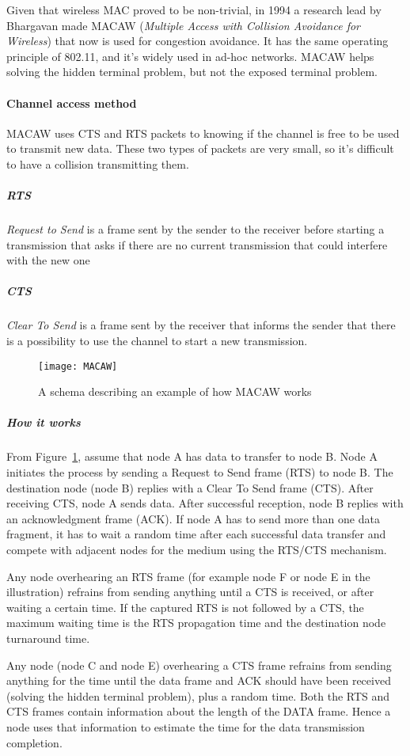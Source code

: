 Given that wireless MAC proved to be non-trivial, in 1994 a research lead by
Bhargavan made MACAW (\textit{Multiple Access with Collision Avoidance for
  Wireless}) that now is used for congestion avoidance. It has the same
operating principle of 802.11, and it's widely used in ad-hoc networks.
MACAW helps solving the hidden terminal problem, but not the exposed terminal
problem.

\paragraph*{Channel access method}
MACAW uses CTS and RTS packets to knowing if the channel is free to be used to
transmit new data. These two types of packets are very small, so it's difficult
to have a collision transmitting them.

\subparagraph*{RTS} \textit{Request to Send} is a frame sent by the
sender to the receiver before starting a transmission that asks if there are no
current transmission that could interfere with the new one

\subparagraph*{CTS} \textit{Clear To Send} is a frame sent by the receiver
that informs the sender that there is a possibility to use the channel to start
a new transmission.

\begin{figure}[t]
  \centering
  \texttt{[image: MACAW]}
  \caption{A schema describing an example of how MACAW works}
  \label{fig:mac:macaw}
\end{figure}

\subparagraph*{How it works} From Figure~\ref{fig:mac:macaw}, assume that node A
has data to transfer to node B.
Node A initiates the process by sending a Request to Send frame (RTS) to node B.
The destination node (node B) replies with a Clear To Send frame (CTS). After
receiving CTS, node A sends data. After successful reception, node B replies
with an acknowledgment frame (ACK). If node A has to send more than one data
fragment, it has to wait a random time after each successful data transfer and
compete with adjacent nodes for the medium using the RTS/CTS mechanism.

Any node overhearing an RTS frame (for example node F or node E in the
illustration) refrains from sending anything until a CTS is received, or after
waiting a certain time. If the captured RTS is not followed by a CTS, the
maximum waiting time is the RTS propagation time and the destination node
turnaround time.

Any node (node C and node E) overhearing a CTS frame refrains from sending
anything for the time until the data frame and ACK should have been received
(solving the hidden terminal problem), plus a random time. Both the RTS and CTS
frames contain information about the length of the DATA frame. Hence a node uses
 that information to estimate the time for the data transmission completion.

